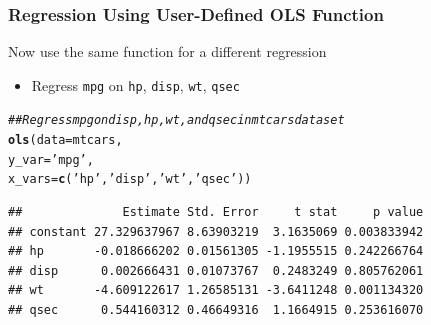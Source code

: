 \documentclass{beamer}\usepackage[]{graphicx}\usepackage[]{xcolor}
\makeatletter
\newcommand{\hlstr}[1]{\textcolor[rgb]{0.192,0.494,0.8}{#1}}%
\newcommand{\hlcom}[1]{\textcolor[rgb]{0.678,0.584,0.686}{\textit{#1}}}%
\newcommand{\hlstd}[1]{\textcolor[rgb]{0.345,0.345,0.345}{#1}}%
\newcommand{\hlkwc}[1]{\textcolor[rgb]{0.333,0.667,0.333}{#1}}%
\newcommand{\hlkwd}[1]{\textcolor[rgb]{0.737,0.353,0.396}{\textbf{#1}}}%
\newenvironment{kframe}{%
 \def\at@end@of@kframe{}%
 \ifinner\ifhmode%
  \def\at@end@of@kframe{\end{minipage}}%
  \begin{minipage}{\columnwidth}%
 \fi\fi%
 \def\FrameCommand##1{\hskip\@totalleftmargin \hskip-\fboxsep
 \colorbox{shadecolor}{##1}\hskip-\fboxsep
     \hskip-\linewidth \hskip-\@totalleftmargin \hskip\columnwidth}%
 \MakeFramed {\advance\hsize-\width
   \@totalleftmargin\z@ \linewidth\hsize
   \@setminipage}}%
 {\par\unskip\endMakeFramed%
 \at@end@of@kframe}
\newenvironment{knitrout}{}{} %
\makeatother
\begin{document}
\begin{frame}[fragile]\frametitle{Regression Using User-Defined OLS Function}
    Now use the same function for a different regression
    \begin{itemize}
        \item Regress \texttt{mpg} on \texttt{hp}, \texttt{disp}, \texttt{wt}, \texttt{qsec}
    \end{itemize}
\begin{knitrout}\footnotesize
{}\color{fgcolor}\begin{kframe}
\begin{alltt}
\hlcom{## Regress mpg on disp, hp, wt, and qsec in mtcars dataset}
\hlkwd{ols}\hlstd{(}\hlkwc{data} \hlstd{= mtcars,}
    \hlkwc{y_var} \hlstd{=} \hlstr{'mpg'}\hlstd{,}
    \hlkwc{x_vars} \hlstd{=} \hlkwd{c}\hlstd{(}\hlstr{'hp'}\hlstd{,} \hlstr{'disp'}\hlstd{,} \hlstr{'wt'}\hlstd{,} \hlstr{'qsec'}\hlstd{))}
\end{alltt}
\begin{verbatim}
##              Estimate Std. Error     t stat     p value
## constant 27.329637967 8.63903219  3.1635069 0.003833942
## hp       -0.018666202 0.01561305 -1.1955515 0.242266764
## disp      0.002666431 0.01073767  0.2483249 0.805762061
## wt       -4.609122617 1.26585131 -3.6411248 0.001134320
## qsec      0.544160312 0.46649316  1.1664915 0.253616070
\end{verbatim}
\end{kframe}
\end{knitrout}
\end{frame}
\end{document}

